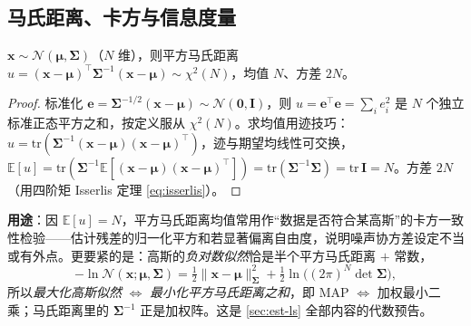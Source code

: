\subsection{马氏距离、卡方与信息度量}
\label{sec:est-mahalanobis}

\begin{proposition}\label{prop:chi2}
$\mathbf{x}\sim\mathcal{N}(\boldsymbol{\mu},\boldsymbol{\Sigma})$（$N$ 维），则平方马氏距离 $u=(\mathbf{x}-\boldsymbol{\mu})^\top\boldsymbol{\Sigma}^{-1}(\mathbf{x}-\boldsymbol{\mu})\sim\chi^2(N)$，均值 $N$、方差 $2N$。
\end{proposition}
\begin{proof}
标准化 $\mathbf{e}=\boldsymbol{\Sigma}^{-1/2}(\mathbf{x}-\boldsymbol{\mu})\sim\mathcal{N}(\mathbf{0},\mathbf{I})$，则 $u=\mathbf{e}^\top\mathbf{e}=\sum_i e_i^2$ 是 $N$ 个独立标准正态平方之和，按定义服从 $\chi^2(N)$。求均值用迹技巧：$u=\mathrm{tr}(\boldsymbol{\Sigma}^{-1}(\mathbf{x}-\boldsymbol{\mu})(\mathbf{x}-\boldsymbol{\mu})^\top)$，迹与期望均线性可交换，$\mathbb{E}[u]=\mathrm{tr}(\boldsymbol{\Sigma}^{-1}\mathbb{E}[(\mathbf{x}-\boldsymbol{\mu})(\mathbf{x}-\boldsymbol{\mu})^\top])=\mathrm{tr}(\boldsymbol{\Sigma}^{-1}\boldsymbol{\Sigma})=\mathrm{tr}\,\mathbf{I}=N$。方差 $2N$（用四阶矩 Isserlis 定理 \cref{eq:isserlis}）。
\end{proof}
\noindent\textbf{用途}：因 $\mathbb{E}[u]=N$，平方马氏距离均值常用作“数据是否符合某高斯”的卡方一致性检验——估计残差的归一化平方和若显著偏离自由度，说明噪声协方差设定不当或有外点。更要紧的是：高斯的\emph{负对数似然}恰是半个平方马氏距离 $+$ 常数，
\begin{equation}
  -\ln\mathcal{N}(\mathbf{x};\boldsymbol{\mu},\boldsymbol{\Sigma})=\tfrac12\|\mathbf{x}-\boldsymbol{\mu}\|_{\boldsymbol{\Sigma}}^2+\tfrac12\ln\big((2\pi)^N\det\boldsymbol{\Sigma}\big),
  \label{eq:neglog-gauss}
\end{equation}
所以\emph{最大化高斯似然} $\Longleftrightarrow$ \emph{最小化平方马氏距离之和}，即 MAP $\Longleftrightarrow$ 加权最小二乘；马氏距离里的 $\boldsymbol{\Sigma}^{-1}$ 正是加权阵。这是 \cref{sec:est-ls} 全部内容的代数预告。

